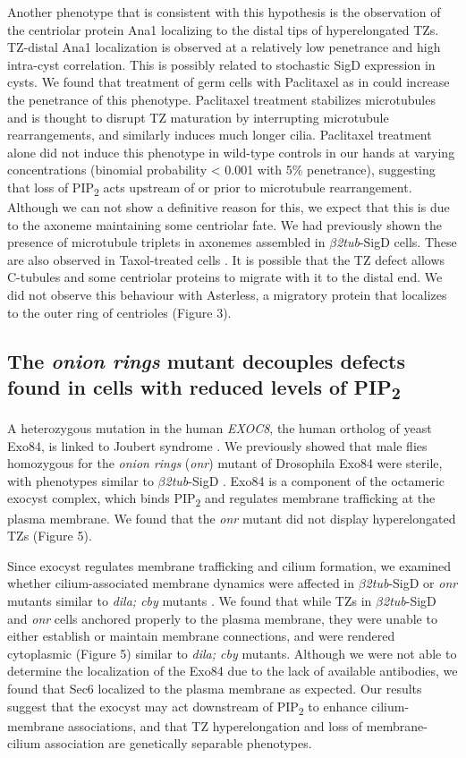 \documentclass[12pt, twoside, letterpaper]{article}
\newcommand{\PIP}{PIP\textsubscript{2}}
\newcommand{\sigd}{$\beta$\textit{2tub}-SigD}
\begin{document}
Another phenotype that is consistent with this hypothesis is
the observation of the centriolar protein Ana1 localizing to the distal tips of
hyperelongated TZs.
TZ-distal Ana1 localization is observed at a relatively low penetrance
and high intra-cyst correlation.
This is possibly related to stochastic SigD expression in cysts.
We found that treatment of germ cells with Paclitaxel as in \citep{riparbelli2013unique}
could increase the penetrance of this phenotype.
Paclitaxel treatment stabilizes microtubules and is thought to disrupt TZ maturation
by interrupting microtubule rearrangements, and similarly induces much longer cilia.
Paclitaxel treatment alone did not induce this phenotype in wild-type controls in our hands
at varying concentrations (binomial probability < 0.001 with 5\% penetrance),
suggesting that loss of \PIP{} acts upstream of or prior to microtubule rearrangement.
Although we can not show a definitive reason for this, we expect that this is due to
the axoneme maintaining some centriolar fate.
We had previously shown the presence of microtubule triplets in axonemes assembled in \sigd{}
cells.
These are also observed in Taxol-treated cells \citep{riparbelli2013unique}.
It is possible that the TZ defect allows C-tubules and some centriolar proteins
to migrate with it to the distal end.
We did not observe this behaviour with Asterless,
a migratory protein that localizes to the outer
ring of centrioles (Figure 3).

\subsection{The \textit{onion rings} mutant decouples defects found in cells with reduced levels of \PIP{}}
A heterozygous mutation in the human \textit{EXOC8},
the human ortholog of yeast Exo84, is linked to
Joubert syndrome \citep{dixon2012exome}.
We previously showed that male flies homozygous for the \textit{onion rings}
(\textit{onr}) mutant of Drosophila Exo84 were sterile, with phenotypes
similar to \sigd{} \citep{wei2008depletion}.
Exo84 is a component of the octameric exocyst complex, which binds
\PIP{} and regulates membrane trafficking at the plasma membrane.
We found that the \textit{onr} mutant did not display hyperelongated TZs (Figure 5).

Since exocyst regulates membrane trafficking and cilium formation,
we examined whether cilium-associated membrane dynamics were affected in \sigd{}
or \textit{onr} mutants similar to \textit{dila; cby} mutants
\citep{vieillard2016transition}.
We found that while TZs in \sigd{} and \textit{onr} cells anchored properly
to the plasma membrane, they were unable to either establish or maintain
membrane connections, and were rendered cytoplasmic (Figure 5) similar to
\textit{dila; cby} mutants.
Although we were not able to determine the localization of the Exo84 due to the
lack of available antibodies,
we found that Sec6 localized to the plasma membrane as expected.
Our results suggest that the exocyst may act downstream of \PIP{} to
enhance cilium-membrane associations, and that TZ hyperelongation and loss of
membrane-cilium association are genetically separable phenotypes.
\end{document}
